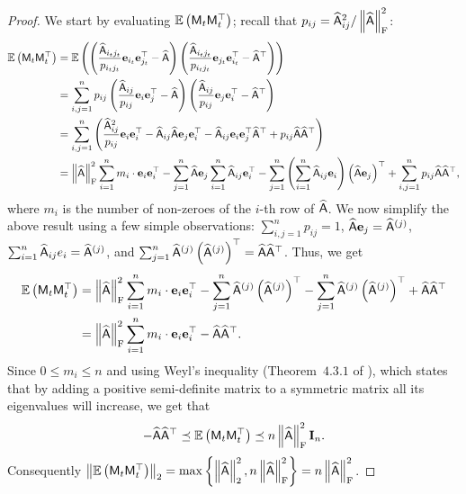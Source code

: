\begin{proof}
%
We start by evaluating $\operatorname{\mathbb{E}}\left({\mathsf{M} }_t {\mathsf{M} }_t^\top\right)$; recall that $p_{ij} = \widehat{{\mathsf{A} }}_{ij}^2/\left\|\widehat{{\mathsf{A} }}\right\|_{\textrm{F}}^2$:
%
\begin{align*}
%
\EE\left(\matM_t\matM_t^\top\right) &= \EE\left(\left(\frac{\widehat{\matA}_{i_tj_t}}{p_{i_tj_t}} \e_{i_t} \e_{j_t}^\top-\widehat{\matA}\right)\left(\frac{\widehat{\matA}_{i_tj_t}}{p_{i_tj_t}}\e_{j_t}\e_{i_t}^\top-\widehat{\matA}^\top\right)\right)\\
%
&= \sum_{i,j=1}^n p_{ij}\left(\frac{\widehat{\matA}_{ij}}{p_{ij}} \e_{i}\e_{j}^\top-\widehat{\matA}\right)\left(\frac{\widehat{\matA}_{ij}}{p_{ij}} \e_{j}\e_{i}^\top - \widehat{\matA}^\top\right)\\
%
&= \sum_{i,j=1}^n \left(\frac{\widehat{\matA}_{ij}^2}{p_{ij}}\e_{i}\e_{i}^\top-\widehat{\matA}_{ij} \widehat{\matA} \e_j \e_i^\top - \widehat{\matA}_{ij} \e_i \e_j^\top \widehat{\matA}^\top +p_{ij}\widehat{\matA}\widehat{\matA}^\top\right)\\
%
&= \frobnorm{\widehat{\matA}}^2 \sum_{i=1}^n m_i\cdot \e_i \e_i^\top  -\sum_{j=1}^n \widehat{\matA} \e_j \sum_{i=1}^n \widehat{\matA}_{ij} \e_i^\top - \sum_{j=1}^n\left(\sum_{i=1}^n\widehat{\matA}_{ij} \e_i\right) \left(\widehat{\matA} \e_j\right)^\top + \sum_{i,j=1}^n p_{ij} \widehat{\matA} \widehat{\matA}^\top,
%
\end{align*}
where $m_i$ is the number of non-zeroes of the $i$-th row of $\widehat{{\mathsf{A} }}$.
%
We now simplify the above result using a few simple observations: $\sum_{i,j=1}^n p_{ij}=1$, $\widehat{{\mathsf{A} }} {\mathbf e}_j = \widehat{{\mathsf{A} }}^{(j)}$, $\sum_{i=1}^n \widehat{{\mathsf{A} }}_{ij}e_i = \widehat{{\mathsf{A} }}^{(j)}$, and $\sum_{j=1}^n \widehat{{\mathsf{A} }}^{(j)} \left(\widehat{{\mathsf{A} }}^{(j)}\right)^\top = \widehat{{\mathsf{A} }} \widehat{{\mathsf{A} }}^\top$. Thus, we get
%
\begin{align*}
%
\EE\left(\matM_t\matM_t^\top\right) &= \frobnorm{\widehat{\matA}}^2 \sum_{i=1}^n m_i\cdot \e_i \e_i^\top  -\sum_{j=1}^n \widehat{\matA}^{(j)} \left(\widehat{\matA}^{(j)}\right)^\top - \sum_{j=1}^n \widehat{\matA}^{(j)} \left(\widehat{\matA}^{(j)}\right)^\top + \widehat{\matA} \widehat{\matA}^\top\\
%
&= \frobnorm{\widehat{\matA}}^2 \sum_{i=1}^n m_i\cdot \e_i \e_i^\top  - \widehat{\matA} \widehat{\matA}^\top.
%
\end{align*}
%
Since $0\leq m_i \leq n$ and using Weyl's inequality (Theorem~$4.3.1$ of \cite{book:matrix_analysis:HornJohnson}), which states that by adding a positive semi-definite matrix to a symmetric matrix all its eigenvalues will increase, we get that
\[ -\widehat{{\mathsf{A} }}\widehat{{\mathsf{A} }}^\top \preceq \operatorname{\mathbb{E}}\left({\mathsf{M} }_t{\mathsf{M} }_t^\top\right) \preceq n \left\|\widehat{{\mathsf{A} }}\right\|_{\textrm{F}}^2 \mathbf{I}_n.\]
%
Consequently $\left\|\operatorname{\mathbb{E}}{\left({\mathsf{M} }_t {\mathsf{M} }_t^\top\right)}\right\|_2 = \max\left\{ \left\|\widehat{{\mathsf{A} }}\right\|_2^2, n\left\|\widehat{{\mathsf{A} }}\right\|_{\textrm{F}}^2\right\} = n \left\|\widehat{{\mathsf{A} }}\right\|_{\textrm{F}}^2$.
%
%
\end{proof}
%

